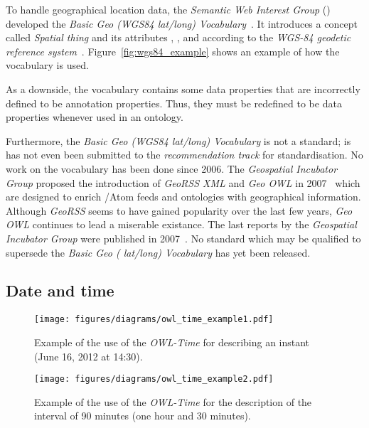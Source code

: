 To handle geographical location data, the \emph{ Semantic Web Interest Group} () developed the \emph{Basic Geo (WGS84 lat/long) Vocabulary}~\cite{wgs84_vocabulary}. It introduces a concept called \emph{Spatial thing} and its attributes , , and  according to the \emph{WGS-84 geodetic reference system}~\cite{WGS84}. Figure~\ref{fig:wgs84_example} shows an example of how the vocabulary is used.

As a downside, the vocabulary contains some data properties that are incorrectly defined to be annotation properties. Thus, they must be redefined to be data properties whenever used in an  ontology.

Furthermore, the \emph{Basic Geo (WGS84 lat/long) Vocabulary} is not a standard; is has not even been submitted to the \emph{ recommendation track} for standardisation. No work on the vocabulary has been done since 2006. The \emph{ Geospatial Incubator Group} proposed the introduction of \emph{GeoRSS XML} and \emph{Geo OWL} in 2007~\cite{w3c_geo_report1} which are designed to enrich /Atom feeds and  ontologies with geographical information. Although \emph{GeoRSS} seems to have gained popularity over the last few years, \emph{Geo OWL} continues to lead a miserable existance. The last reports by the \emph{ Geospatial Incubator Group} were published in 2007~\cite{w3c_geo_report1,w3c_geo_report2}. No standard which may be qualified to supersede the \emph{Basic Geo ( lat/long) Vocabulary} has yet been released.

\subsection{Date and time}
\label{subsec:date_ontologies}

\begin{figure}
\centering
\texttt{[image: figures/diagrams/owl\_time\_example1.pdf]}
\caption[Example of the use of the \emph{OWL-Time} for describing an instant]{Example of the use of the \emph{OWL-Time} for describing an instant (June 16, 2012 at 14:30).}
\label{fig:owl_time_example1}
\end{figure}

\begin{figure}
\centering
\texttt{[image: figures/diagrams/owl\_time\_example2.pdf]}
\caption[Example of the use of the \emph{OWL-Time} for the description an interval]{Example of the use of the \emph{OWL-Time} for the description of the interval of 90 minutes (one hour and 30 minutes).}
\label{fig:owl_time_example2}
\end{figure}


